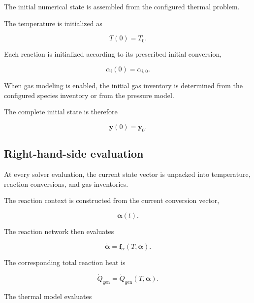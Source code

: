 The initial numerical state is assembled from the configured thermal
problem.

The temperature is initialized as

\begin{equation}
    T(0)
    =
    T_0.
\end{equation}

Each reaction is initialized according to its prescribed initial
conversion,

\begin{equation}
    \alpha_i(0)
    =
    \alpha_{i,0}.
\end{equation}

When gas modeling is enabled, the initial gas inventory is determined
from the configured species inventory or from the pressure model.

The complete initial state is therefore

\begin{equation}
    \mathbf{y}(0)
    =
    \mathbf{y}_0.
\end{equation}


\subsection{Right-hand-side evaluation}

At every solver evaluation, the current state vector is unpacked into
temperature, reaction conversions, and gas inventories.

The reaction context is constructed from the current conversion vector,

\begin{equation}
    \boldsymbol{\alpha}(t).
\end{equation}

The reaction network then evaluates

\begin{equation}
    \dot{\boldsymbol{\alpha}}
    =
    \mathbf{f}_{\alpha}
    \left(
        T,
        \boldsymbol{\alpha}
    \right).
    \label{eq:rhs_reaction_rates}
\end{equation}

The corresponding total reaction heat is

\begin{equation}
    \dot{Q}_{\mathrm{gen}}
    =
    \dot{Q}_{\mathrm{gen}}
    \left(
        T,
        \boldsymbol{\alpha}
    \right).
\end{equation}

The thermal model evaluates

